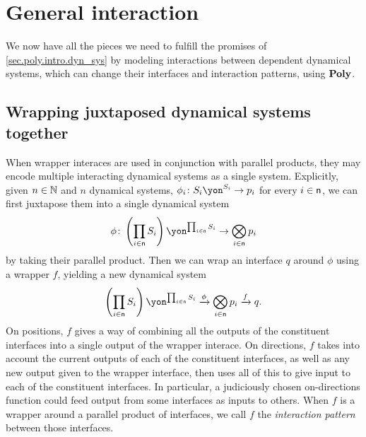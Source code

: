 \documentclass[Book-Poly]{subfiles}
\begin{document}

\section{General interaction}\label{sec.poly.dyn_sys.interact}

We now have all the pieces we need to fulfill the promises of \cref{sec.poly.intro.dyn_sys} by modeling interactions between dependent dynamical systems, which can change their interfaces and interaction patterns, using $\mathbf{Poly}$.

\subsection{Wrapping juxtaposed dynamical systems together}

When wrapper interaces are used in conjunction with parallel products, they may encode multiple interacting dynamical systems as a single system.
Explicitly, given $n\in\mathbb{N}$ and $n$ dynamical systems, $\phi_i\colon S_i\yon^{S_i}\to p_i$ for every $i\in\mathsf{n}$, we can first juxtapose them into a single dynamical system
\[\phi\colon \left(\prod_{i\in\ord{n}}S_i\right)\yon^{\prod_{i\in\ord{n}}S_i}\to\bigotimes_{i\in\ord{n}}p_i\]
by taking their parallel product.
Then we can wrap an interface $q$ around $\phi$ using a wrapper $f$, yielding a new dynamical system
\[\left(\prod_{i\in\ord{n}}S_i\right)\yon^{\prod_{i\in\ord{n}}S_i}\To{\phi}\bigotimes_{i\in\ord{n}}p_i\To{f}q.\]
On positions, $f$ gives a way of combining all the outputs of the constituent interfaces into a single output of the wrapper interace.
On directions, $f$ takes into account the current outputs of each of the constituent interfaces, as well as any new output given to the wrapper interface, then uses all of this to give input to each of the constituent interfaces.
In particular, a judiciously chosen on-directions function could feed output from some interfaces as inputs to others.
When $f$ is a wrapper around a parallel product of interfaces, we call $f$ the \emph{interaction pattern} between those interfaces.
\end{document}
